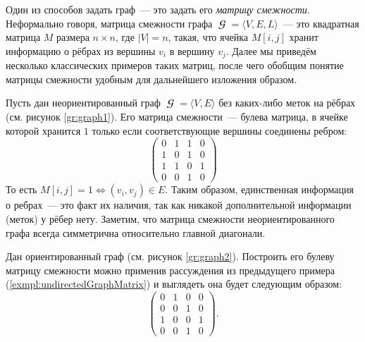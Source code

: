 Один из способов задать граф~--- это задать его \emph{матрицу смежности}.
Неформально говоря, матрица смежности графа $\mbfscrG = \langle V, E, L \rangle$~--- это квадратная матрица $M$ размера $n \times n$, где $|V| = n$,
такая, что ячейка $M[i,j]$ хранит информацию о рёбрах из вершины $v_i$ в вершину $v_j$.
Далее мы приведём несколько классических примеров таких матриц, после чего обобщим понятие матрицы смежности удобным для дальнейшего изложения образом.

\begin{marginfigure}
    \begin{center}
        \resizebox{\marginparwidth}{!}{}
    \end{center}
    \caption{Неориентированный граф}
    \label{gr:graph1}
\end{marginfigure}
\begin{example}
    \label{exmpl:undirectedGraphMatrix}
    Пусть дан неориентированный граф $\mbfscrG = \langle V, E\rangle$ без каких-либо меток на рёбрах (см. рисунок \ref{gr:graph1}).
    Его матрица смежности~--- булева матрица, в ячейке которой хранится $1$ только если соответствующие вершины соединены ребром:
    \[
        \begin{pmatrix}
            0 & 1 & 1 & 0 \\
            1 & 0 & 1 & 0 \\
            1 & 1 & 0 & 1 \\
            0 & 0 & 1 & 0
        \end{pmatrix}
    \]
    То есть $M[i,j] = 1 \iff (v_i,v_j) \in E$.
    Таким образом, единственная информация о ребрах~--- это факт их наличия, так как никакой дополнительной информации (меток) у рёбер нету.
    Заметим, что матрица смежности неориентированного графа всегда симметрична относительно главной диагонали.
\end{example}

\begin{marginfigure}
    \begin{center}
        \resizebox{\marginparwidth}{!}{}
    \end{center}
    \caption{Ориентированный граф}
    \label{gr:graph2}
\end{marginfigure}
\begin{example}
    \label{example:diGraph}
    Дан ориентированный граф (см. рисунок \ref{gr:graph2}).
    Построить его булеву матрицу смежности можно применив рассуждения из предыдущего примера (\ref{exmpl:undirectedGraphMatrix}) и выглядеть она будет следующим образом:
    \[
        \begin{pmatrix}
            0 & 1 & 0 & 0 \\
            0 & 0 & 1 & 0 \\
            1 & 0 & 0 & 1 \\
            0 & 0 & 1 & 0
        \end{pmatrix}.
    \]
\end{example}

